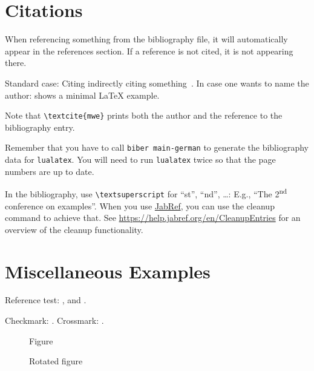 \section{Citations}

When referencing something from the bibliography file, it will automatically appear in the references section.
If a reference is not cited, it is not appearing there.

\begin{ltgexample}
Standard case: Citing indirectly citing something~\cite{mwe}.
In case one wants to name the author: \textcite{mwe} shows a minimal \LaTeX{} example.
\end{ltgexample}

Note that \texttt{\textbackslash textcite\{mwe\}} prints both the author and the reference to the bibliography entry.

Remember that you have to call \texttt{biber main-german} to generate the bibliography data for \texttt{lualatex}.
You will need to run \texttt{lualatex} twice so that the page numbers are up to date.


In the bibliography, use \texttt{\textbackslash textsuperscript} for \enquote{st}, \enquote{nd}, \ldots:
E.g., \enquote{The 2\textsuperscript{nd} conference on examples}.
When you use \href{https://www.jabref.org}{JabRef}, you can use the cleanup command to achieve that.
See \url{https://help.jabref.org/en/CleanupEntries} for an overview of the cleanup functionality.

\section{Miscellaneous Examples}
\label{ssec:example}

Reference test: ,  and .

\begin{ltgexample}
Checkmark: \dingcheck.
Crossmark: \dingcross.
\end{ltgexample}

\begin{figure}
  \missingfigure{}
  \caption{Figure}
  \label{fig:Abbildung}
\end{figure}

\begin{landscape}
  \begin{figure}
    \missingfigure{}
    \caption{Rotated figure}
    \label{fig:AbbildungGedreht}
  \end{figure}
\end{landscape}

